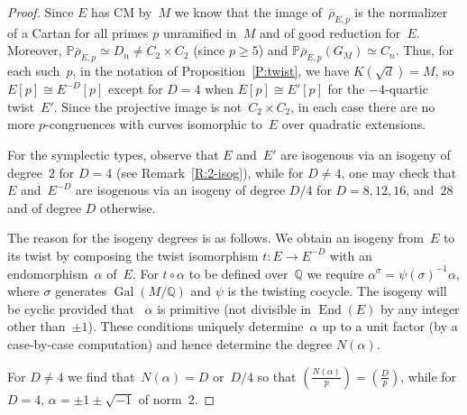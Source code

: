 \documentclass[12pt, reqno]{amsart}
\newcommand{\PP}{\mathbb{P}}
\newcommand{\Q}{\mathbb{Q}}
\newcommand{\Z}{\mathbb{Z}}
\newcommand{\rhobar}{{\overline{\rho}}}
\DeclareMathOperator{\End}{End}
\DeclareMathOperator{\Gal}{Gal}
\def\legendre#1#2{\left(\displaystyle\frac{#1}{#2}\right)}
\numberwithin{equation}{section}
\theoremstyle{definition}
\theoremstyle{remark}
\begin{document}
\begin{proof}
Since $E$ has CM by~$M$ we know that the image of~$\rhobar_{E,p}$ is
the normalizer of a Cartan for all primes $p$ unramified in~$M$ and of
good reduction for~$E$.  Moreover, $\PP \rhobar_{E,p} \simeq D_n \neq
C_2 \times C_2$ (since $p \geq 5$) and $\PP \rhobar_{E,p}(G_M) \simeq
C_n$. Thus, for each such~$p$, in the notation of
Proposition~\ref{P:twist}, we have $K(\sqrt{d})=M$, so $E[p]\cong
E^{-D}[p]$ except for $D=4$ when $E[p]\cong E'[p]$ for the
$-4$-quartic twist~$E'$.  Since the projective image is not~$C_2\times
C_2$, in each case there are no more $p$-congruences with curves
isomorphic to~$E$ over quadratic extensions.

For the symplectic types, observe that $E$ and~$E'$ are isogenous via
an isogeny of degree~$2$ for $D=4$ (see Remark~\ref{R:2-isog}), while
for $D\not=4$, one may check that $E$ and~$E^{-D}$ are isogenous via
an isogeny of degree $D/4$ for $D=8,12,16$, and~$28$ and of degree $D$
otherwise.

The reason for the isogeny degrees is as follows.  We obtain an
isogeny from~$E$ to its twist by composing the twist isomorphism
$t:E\to E^{-D}$ with an endomorphism~$\alpha$ of~$E$.  For
$t\circ\alpha$ to be defined over~$\Q$ we require
$\alpha^{\sigma}=\psi(\sigma)^{-1}\alpha$, where $\sigma$ generates
$\Gal(M/\Q)$ and $\psi$ is the twisting cocycle.  The isogeny will be
cyclic provided that ~$\alpha$ is primitive (not divisible in
$\End(E)$ by any integer other than~$\pm1$).  These conditions uniquely
determine~$\alpha$ up to a unit factor (by a case-by-case computation)
and hence determine the degree $N(\alpha)$.
\begin{comment}
  Apart from the special case $D=4$, we have $\psi(\sigma)=-1$, so
$\alpha$ is pure imaginary.  This uniquely determines~$\alpha$ up to
sign, and the degree of the isogeny is the norm of~$\alpha$:

$D = 3, 7, 11, 19, 43, 67, 163$: $\End(E)\cong\Z[(1+\sqrt{-D})/2]$,
$\alpha=\pm\sqrt{-D}$, norm~$D$.

$D = 16$: $\End(E)\cong\Z[2\sqrt{-1}]$, $\alpha=\pm2\sqrt{-1}$, norm~$4$.

$D = 8$: $\End(E)\cong\Z[\sqrt{-2}]$, $\alpha=\pm\sqrt{-2}$, norm~$2$.

$D = 12$: $\End(E)\cong\Z[\sqrt{-3}]$, $\alpha=\pm\sqrt{-3}$, norm~$3$.

$D = 27$: $\End(E)\cong\Z[3\sqrt{-3}]$, $\alpha=\pm3\sqrt{-3}$, norm~$27$.

$D = 28$: $\End(E)\cong\Z[\sqrt{-7}]$, $\alpha=\pm\sqrt{-7}$, norm~$7$.

When $D=4$ we have $\psi(\sigma)=\pm i$ and $\alpha=\pm1\pm i$, with
norm~$2$.
\end{comment}
For $D\not=4$ we find that~$N(\alpha)=D$ or~$D/4$ so that
$\legendre{N(\alpha)}{p}=\legendre{D}{p}$, while for $D=4$,
$\alpha=\pm1\pm\sqrt{-1}$ of norm~$2$.
\end{proof}
\end{document}
